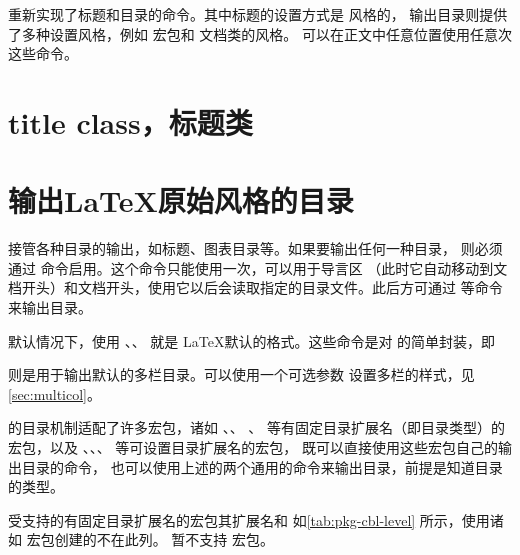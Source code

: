 \documentclass[twoside]{book}
\begin{document}
\CusTeX 重新实现了标题和目录的命令。其中标题的设置方式是 \CTeX 风格的，
输出目录则提供了多种设置风格，例如  宏包和  文档类的风格。
可以在正文中任意位置使用任意次这些命令。


\section{title class，标题类}\label{sec:struct-title-class}


\section{输出\LaTeX 原始风格的目录}

\CusTeX 接管各种目录的输出，如标题、图表目录等。如果要输出任何一种目录，
则必须通过  命令启用。这个命令只能使用一次，可以用于导言区
（此时它自动移动到文档开头）和文档开头，使用它以后会读取指定的目录文件。此后方可通过
 等命令来输出目录。

默认情况下，使用 、、 就是
\LaTeX 默认的格式。这些命令是对  的简单封装，即

\begin{xample}
\DeclareRobustCommand\tableofcontents[1][columns=1]
  {\multicolplaincombinedlist[{#1}]{\contentsname}{toc}}
\DeclareRobustCommand\listoffigures[1][columns=1]
  {\multicolplaincombinedlist[{#1}]{\listfigurename}{lof}}
\DeclareRobustCommand\listoftables[1][columns=1]
  {\multicolplaincombinedlist[{#1}]{\listtablename}{lot}}
\stopxamplecode 
\xamplecode \medskip
\end{xample}

 则是用于输出默认的多栏目录。可以使用一个可选参数
设置多栏的样式，见\cref{sec:multicol}。

\CusTeX 的目录机制适配了许多宏包，诸如 、、
、 等有固定目录扩展名（即目录类型）的宏包，以及
、、、 等可设置目录扩展名的宏包，
既可以直接使用这些宏包自己的输出目录的命令，
也可以使用上述的两个通用的命令来输出目录，前提是知道目录的类型。

受支持的有固定目录扩展名的宏包其扩展名和  
如\cref{tab:pkg-cbl-level} 所示，使用诸如  宏包创建的不在此列。
暂不支持  宏包。
\end{document}
